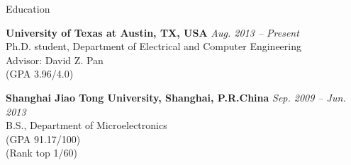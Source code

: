 

\begin{rSection}{Education}


{\bf University of Texas at Austin, TX, USA} \hfill {\em Aug. 2013 -- Present} \\ 
Ph.D. student, Department of Electrical and Computer Engineering \\
Advisor: David Z. Pan \\
(GPA 3.96/4.0) 

{\bf Shanghai Jiao Tong University, Shanghai, P.R.China} \hfill {\em Sep. 2009 -- Jun. 2013} \\ 
B.S., Department of Microelectronics \\
(GPA 91.17/100) \\
(Rank top 1/60)

\end{rSection}

